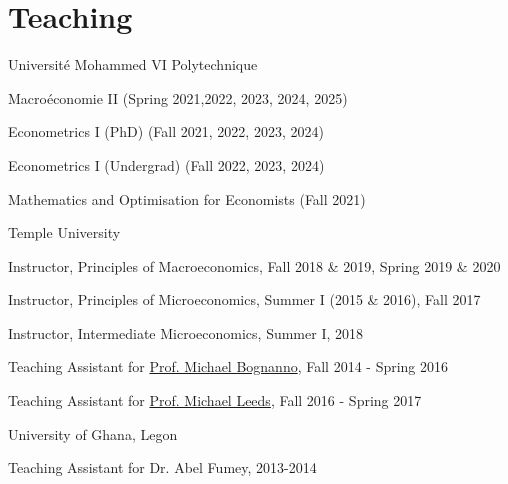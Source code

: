 \documentclass[12pt,letterpaper]{article}
\renewenvironment{itemize}{
  \begin{list}{}{
    \setlength{\leftmargin}{1.5em}
  }
}{
  \end{list}
}
\begin{document}
\section*{Teaching}
\begin{enumerate}
	\item Universit\'e Mohammed VI Polytechnique
	\begin{itemize}
		\item Macro\'economie II (Spring 2021,2022, 2023, 2024, 2025)
		\item Econometrics I (PhD) (Fall 2021, 2022, 2023, 2024)
		\item Econometrics I (Undergrad) (Fall 2022, 2023, 2024)
		\item Mathematics and Optimisation for Economists (Fall 2021)
	\end{itemize}
	\item Temple University
	\begin{itemize}
		\item Instructor, Principles of Macroeconomics, Fall 2018 \& 2019, Spring 2019 \& 2020
		\item Instructor, Principles of Microeconomics, Summer I (2015 \& 2016), Fall 2017
		\item Instructor, Intermediate Microeconomics, Summer I, 2018
		\item Teaching Assistant for \href{https://liberalarts.temple.edu/academics/faculty/bognanno-michael}{Prof. Michael Bognanno}, Fall 2014 - Spring 2016
		\item Teaching Assistant for \href{https://liberalarts.temple.edu/academics/faculty/leeds-michael}{Prof. Michael Leeds}, Fall 2016 - Spring 2017
	\end{itemize}
	\item University of Ghana, Legon
	\begin{itemize}
		\item Teaching Assistant for Dr. Abel Fumey, 2013-2014
	\end{itemize}
\end{enumerate}
\end{document}

